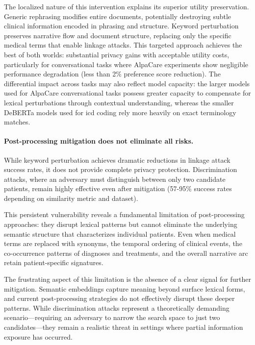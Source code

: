 The localized nature of this intervention explains its superior utility preservation.
Generic rephrasing modifies entire documents, potentially destroying subtle clinical information encoded in phrasing and structure.
Keyword perturbation preserves narrative flow and document structure, replacing only the specific medical terms that enable linkage attacks.
This targeted approach achieves the best of both worlds: substantial privacy gains with acceptable utility costs, particularly for conversational tasks where AlpaCare experiments show negligible performance degradation (less than 2\% preference score reduction).
The differential impact across tasks may also reflect model capacity: the larger models used for AlpaCare conversational tasks possess greater capacity to compensate for lexical perturbations through contextual understanding, whereas the smaller DeBERTa models used for \gls{icd} coding rely more heavily on exact terminology matches.

\paragraph{Post-processing mitigation does not eliminate all risks.}

While keyword perturbation achieves dramatic reductions in linkage attack success rates, it does not provide complete privacy protection.
Discrimination attacks, where an adversary must distinguish between only two candidate patients, remain highly effective even after mitigation (57-95\% success rates depending on similarity metric and dataset).

This persistent vulnerability reveals a fundamental limitation of post-processing approaches: they disrupt lexical patterns but cannot eliminate the underlying semantic structure that characterizes individual patients.
Even when medical terms are replaced with synonyms, the temporal ordering of clinical events, the co-occurrence patterns of diagnoses and treatments, and the overall narrative arc retain patient-specific signatures.

The frustrating aspect of this limitation is the absence of a clear signal for further mitigation.
Semantic embeddings capture meaning beyond surface lexical forms, and current post-processing strategies do not effectively disrupt these deeper patterns.
While discrimination attacks represent a theoretically demanding scenario—requiring an adversary to narrow the search space to just two candidates—they remain a realistic threat in settings where partial information exposure has occurred.

